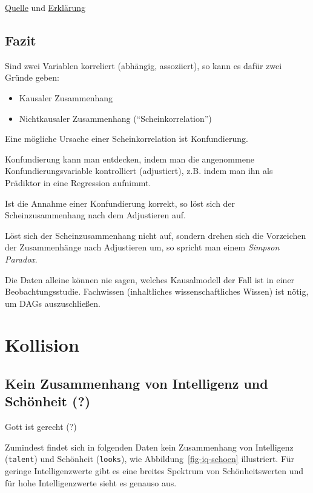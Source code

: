 \documentclass[
  a4paper,
  DIV=11]{scrreprt}
\providecommand{\tightlist}{%
  \setlength{\itemsep}{0pt}\setlength{\parskip}{0pt}}\usepackage{longtable,booktabs,array}
\theoremstyle{definition}
\theoremstyle{remark}
\begin{document}
\href{https://xkcd.com/552/}{Quelle} und
\href{https://www.explainxkcd.com/wiki/index.php/552:_Correlation}{Erklärung}

\hypertarget{fazit-3}{%
\subsection{Fazit}\label{fazit-3}}

Sind zwei Variablen korreliert (abhängig, assoziiert), so kann es dafür
zwei Gründe geben:

\begin{itemize}
\tightlist
\item
  Kausaler Zusammenhang
\item
  Nichtkausaler Zusammenhang (``Scheinkorrelation'')
\end{itemize}

Eine mögliche Ursache einer Scheinkorrelation ist Konfundierung.

Konfundierung kann man entdecken, indem man die angenommene
Konfundierungsvariable kontrolliert (adjustiert), z.B. indem man ihn als
Prädiktor in eine Regression aufnimmt.

Ist die Annahme einer Konfundierung korrekt, so löst sich der
Scheinzusammenhang nach dem Adjustieren auf.

Löst sich der Scheinzusammenhang nicht auf, sondern drehen sich die
Vorzeichen der Zusammenhänge nach Adjustieren um, so spricht man einem
\emph{Simpson Paradox}.

Die Daten alleine können nie sagen, welches Kausalmodell der Fall ist in
einer Beobachtungsstudie. Fachwissen (inhaltliches wissenschaftliches
Wissen) ist nötig, um DAGs auszuschließen.

\hypertarget{kollision}{%
\section{Kollision}\label{kollision}}

\hypertarget{kein-zusammenhang-von-intelligenz-und-schuxf6nheit}{%
\subsection{Kein Zusammenhang von Intelligenz und Schönheit
(?)}\label{kein-zusammenhang-von-intelligenz-und-schuxf6nheit}}

Gott ist gerecht (?)

Zumindest findet sich in folgenden Daten kein Zusammenhang von
Intelligenz (\texttt{talent}) und Schönheit (\texttt{looks}), wie
Abbildung~\ref{fig-iq-schoen} illustriert. Für geringe Intelligenzwerte
gibt es eine breites Spektrum von Schönheitswerten und für hohe
Intelligenzwerte sieht es genauso aus.
\end{document}
